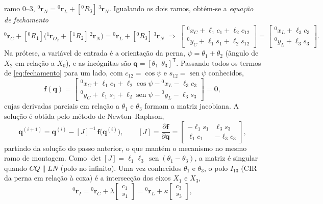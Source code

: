 \documentclass[12pt,a4paper,twoside]{article}
\DeclareMathOperator{\sen}{sen}
\newcommand{\rv}[2]{{}^{#1}\mathbf{r}_{#2}}          %
\newcommand{\Rm}[2]{[{}^{#1}R_{#2}]}                 %
\numberwithin{equation}{section}
\begin{document}
ramo $0\text{--}3$, $\rv{0}{N} = \rv{0}{L} + \Rm{0}{3}\,\rv{3}{N}$. Igualando os dois ramos, obtém-se a
\emph{equação de fechamento}
\begin{equation}
  \rv{0}{C} + \Rm{0}{1}\Big(\rv{1}{O_2} + \Rm{1}{2}\,\rv{2}{N}\Big) = \rv{0}{L} + \Rm{0}{3}\,\rv{3}{N}
  \;\Longrightarrow\;
  \begin{bmatrix} {}^0x_C + \ell_1 c_1 + \ell_2 c_{12} \\ {}^0y_C + \ell_1 s_1 + \ell_2 s_{12} \end{bmatrix}
  = \begin{bmatrix} {}^0x_L + \ell_3 c_3 \\ {}^0y_L + \ell_3 s_3 \end{bmatrix}.
  \label{eq:fechamento}
\end{equation}
Na prótese, a variável de entrada é a orientação da perna, $\psi = \theta_1 + \theta_2$
(ângulo de $X_2$ em relação a $X_0$), e as incógnitas são $\mathbf q = [\theta_1\ \ \theta_3]^{\mathsf T}$.
Passando todos os termos de \eqref{eq:fechamento} para um lado, com $c_{12} = \cos\psi$ e
$s_{12} = \sen\psi$ conhecidos,
\begin{equation*}
  \mathbf f(\mathbf q) =
  \begin{bmatrix} {}^0x_C + \ell_1 c_1 + \ell_2\cos\psi - {}^0x_L - \ell_3 c_3 \\
                  {}^0y_C + \ell_1 s_1 + \ell_2\sen\psi - {}^0y_L - \ell_3 s_3 \end{bmatrix} = \mathbf 0 ,
\end{equation*}
cujas derivadas parciais em relação a $\theta_1$ e $\theta_3$ formam a matriz jacobiana. A
solução é obtida pelo método de Newton--Raphson,
\begin{equation}
  \mathbf q^{(i+1)} = \mathbf q^{(i)} - [J]^{-1}\,\mathbf f\big(\mathbf q^{(i)}\big),
  \qquad
  [J] = \frac{\partial\mathbf f}{\partial\mathbf q} =
  \begin{bmatrix} -\ell_1 s_1 & \ell_3 s_3 \\ \ell_1 c_1 & -\ell_3 c_3 \end{bmatrix},
  \label{eq:newton}
\end{equation}
partindo da solução do passo anterior, o que mantém o mecanismo no mesmo ramo de
montagem. Como $\det[J] = \ell_1\ell_3\,\sen(\theta_1 - \theta_3)$, a matriz é singular quando
$CQ \parallel LN$ (polo no infinito). Uma vez conhecidos $\theta_1$ e $\theta_3$, o polo
$I_{13}$ (CIR da perna em relação à coxa) é a intersecção dos eixos $X_1$ e $X_3$,
\begin{equation}
  \rv{0}{I} = \rv{0}{C} + \lambda\begin{bmatrix} c_1\\ s_1\end{bmatrix} = \rv{0}{L} + \kappa\begin{bmatrix} c_3\\ s_3\end{bmatrix},
\end{equation}
\end{document}
